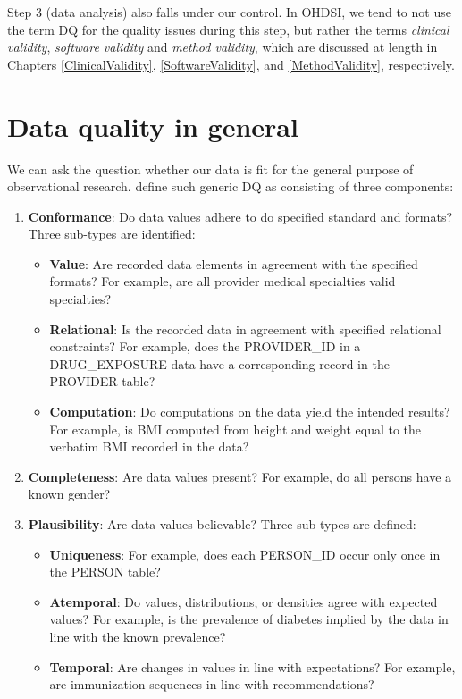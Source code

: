 \documentclass[11pt]{book}
\providecommand{\tightlist}{%
  \setlength{\itemsep}{0pt}\setlength{\parskip}{0pt}}
\theoremstyle{definition}
\theoremstyle{definition}
\theoremstyle{definition}
\theoremstyle{remark}
\begin{document}
Step 3 (data analysis) also falls under our control. In OHDSI, we tend to not use the term DQ for the quality issues during this step, but rather the terms \emph{clinical validity}, \emph{software validity} and \emph{method validity}, which are discussed at length in Chapters \ref{ClinicalValidity}, \ref{SoftwareValidity}, and \ref{MethodValidity}, respectively.

\hypertarget{data-quality-in-general}{%
\section{Data quality in general}\label{data-quality-in-general}}

We can ask the question whether our data is fit for the general purpose of observational research. \citet{kahn_harmonized_2016} define such generic DQ as consisting of three components:

\begin{enumerate}
\def\labelenumi{\arabic{enumi}.}
\tightlist
\item
  \textbf{Conformance}: Do data values adhere to do specified standard and formats? Three sub-types are identified:

  \begin{itemize}
  \tightlist
  \item
    \textbf{Value}: Are recorded data elements in agreement with the specified formats? For example, are all provider medical specialties valid specialties?
  \item
    \textbf{Relational}: Is the recorded data in agreement with specified relational constraints? For example, does the PROVIDER\_ID in a DRUG\_EXPOSURE data have a corresponding record in the PROVIDER table?
  \item
    \textbf{Computation}: Do computations on the data yield the intended results? For example, is BMI computed from height and weight equal to the verbatim BMI recorded in the data?
  \end{itemize}
\item
  \textbf{Completeness}: Are data values present? For example, do all persons have a known gender?
\item
  \textbf{Plausibility}: Are data values believable? Three sub-types are defined:

  \begin{itemize}
  \tightlist
  \item
    \textbf{Uniqueness}: For example, does each PERSON\_ID occur only once in the PERSON table?
  \item
    \textbf{Atemporal}: Do values, distributions, or densities agree with expected values? For example, is the prevalence of diabetes implied by the data in line with the known prevalence?
  \item
    \textbf{Temporal}: Are changes in values in line with expectations? For example, are immunization sequences in line with recommendations?
  \end{itemize}

    
\end{enumerate}
\end{document}
